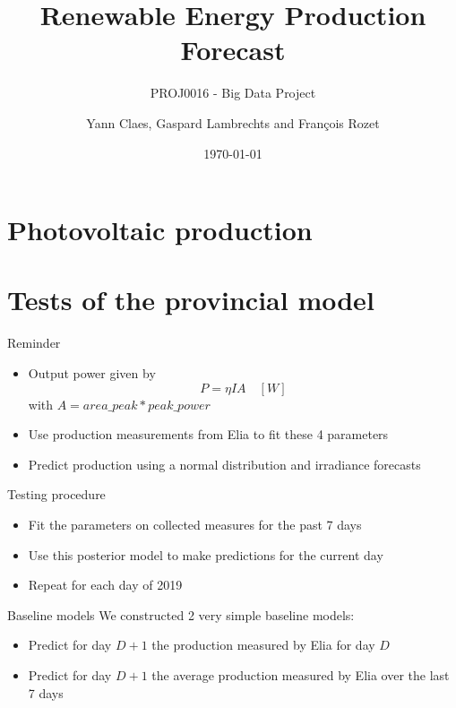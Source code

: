 \documentclass[12pt]{beamer}
\title{Renewable Energy Production Forecast}
\subtitle{PROJ0016 - Big Data Project}
\author{Yann Claes, Gaspard Lambrechts and François Rozet}
\institute{University of Liège}
\date{\today}
\begin{document}
\maketitle

\section{Photovoltaic production}
\section{Tests of the provincial model}

\begin{frame}{Reminder}
    \begin{itemize}
        \item \alert{Output power} given by
        \begin{equation*}
            P = \eta I A \quad [W]
        \end{equation*}
        with $A = area\_peak * peak\_power$
        \item Use production measurements from Elia to \alert{fit} these 4 parameters
        \item \alert{Predict} production using a normal distribution and irradiance forecasts
    \end{itemize}
\end{frame}

\begin{frame}{Testing procedure}
    \begin{itemize}
        \item Fit the parameters on collected measures for the \alert{past 7 days}
        \item Use this posterior model to make predictions for the \alert{current} day
        \item \alert{Repeat} for each day of 2019
    \end{itemize}
\end{frame}

\begin{frame}{Baseline models}
    We constructed 2 very simple baseline models:
    \begin{itemize}
        \item Predict for day $D + 1$ the \alert{production} measured by Elia for day \alert{$D$}
        \item Predict for day $D + 1$ the \alert{average} production measured by Elia over the last 7 days
    \end{itemize}
\end{frame}
\end{document}
